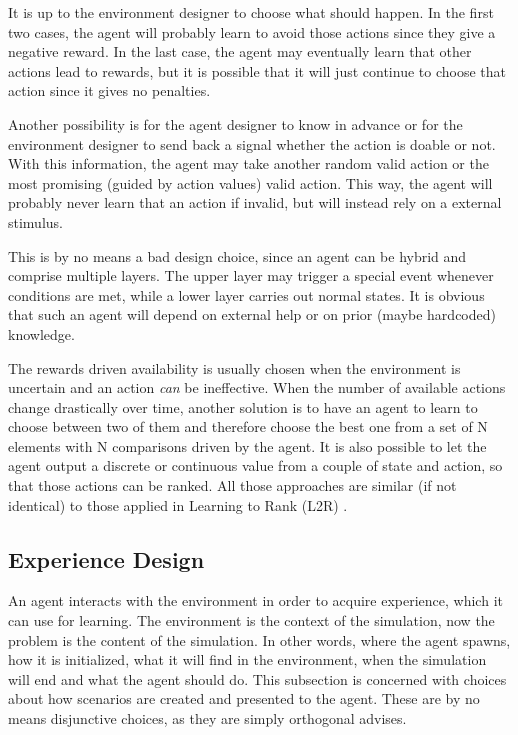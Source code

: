 It is up to the environment designer to choose what should happen. In the first two cases, the agent will probably learn to avoid those actions since they give a negative reward.
In the last case, the agent may eventually learn that other actions lead to rewards, but it is possible that it will just continue to choose that action since it gives no penalties.

Another possibility is for the agent designer to know in advance or for the environment designer to send back a signal whether the action is doable or not.
With this information, the agent may take another random valid action or the most promising (guided by action values) valid action.
This way, the agent will probably never learn that an action if invalid, but will instead rely on a external stimulus.

This is by no means a bad design choice, since an agent can be hybrid and comprise multiple layers.
The upper layer may trigger a special event whenever conditions are met, while a lower layer carries out normal states.
It is obvious that such an agent will depend on external help or on prior (maybe hardcoded) knowledge.

The rewards driven availability is usually chosen when the environment is uncertain and an action \textit{can} be ineffective.
When the number of available actions change drastically over time, another solution is to have an agent to learn to choose between two of them and therefore choose the best one from a set of N elements with N comparisons driven by the agent. It is also possible to let the agent output a discrete or continuous value from a couple of state and action, so that those actions can be ranked. All those approaches are similar (if not identical) to those applied in Learning to Rank (L2R) \cite{akiyama2016learning}.

\subsection{Experience Design}

An agent interacts with the environment in order to acquire experience, which it can use for learning.
The environment is the context of the simulation, now the problem is the content of the simulation.
In other words, where the agent spawns, how it is initialized, what it will find in the environment, when the simulation will end and what the agent should do.
This subsection is concerned with choices about how scenarios are created and presented to the agent.
These are by no means disjunctive choices, as they are simply orthogonal advises.

